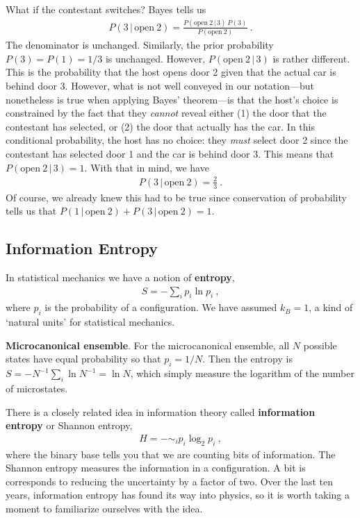 What if the contestant switches? Bayes tells us
\begin{align}
	P(3\,|\,\text{open}~2) = \frac{P(\text{open}~2\,|\,3)\, P(3)}{P(\text{open}~2)} \ .
\end{align}
The denominator is unchanged. Similarly, the prior probability $P(3)=P(1)=1/3$ is unchanged. However, $P(\text{open}~2\,|\,3)$ is rather different. This is the probability that the host opens door 2 given that the actual car is behind door 3. However, what is not well conveyed in our notation---but nonetheless is true when applying Bayes' theorem---is that the host's choice is constrained by the fact that they \emph{cannot} reveal either (1) the door that the contestant has selected, or (2) the door that actually has the car. In this conditional probability, the host has no choice: they \emph{must} select door 2 since the contestant has selected door 1 and the car is behind door 3. This means that $P(\text{open}~2\,|\,3) = 1$. With that in mind, we have
\begin{align}
	P(3\,|\,\text{open}~2) = \frac{2}{3} \ .
\end{align}
Of course, we already knew this had to be true since conservation of probability tells us that $P(1\,|\,\text{open}~2)+P(3\,|\,\text{open}~2)=1$.

\subsection{Information Entropy}

In statistical mechanics we have a notion of \textbf{entropy},
\begin{align}
	S = -\sum_i p_i \ln p_i \ ,
\end{align}
where $p_i$ is the probability of a configuration. We have assumed $k_B=1$, a kind of `natural units' for statistical mechanics. 

\begin{example}
\textbf{Microcanonical ensemble}. For the microcanonical ensemble, all $N$ possible states have equal probability so that $p_i = 1/N$. Then the entropy is $S = -N^{-1}\sum_i\ln N^{-1} = \ln N$, which simply measure the logarithm of the number of microstates. 
\end{example}

There is a closely related idea in information theory called \textbf{information entropy} or Shannon entropy,
\begin{align}
	H = -\sim_i p_i \log_2 p_i \ ,
\end{align}
where the binary base tells you that we are counting bits of information. The Shannon entropy measures the information in a configuration. A bit is corresponds to reducing the uncertainty by a factor of two. Over the last ten years, information entropy has found its way into physics, so it is worth taking a moment to familiarize ourselves with the idea. 

